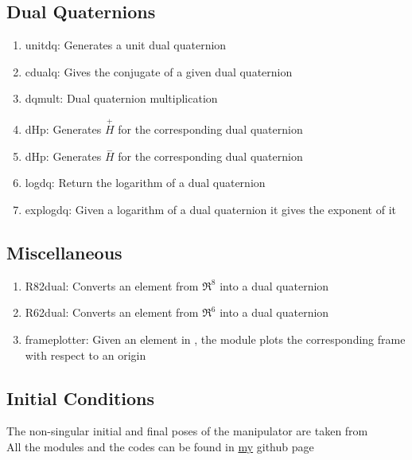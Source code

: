 \documentclass[a4paper,12pt]{article}
\newcommand{\Hp}{\ensuremath{\stackrel{+}{H}}\xspace}
\newcommand{\Hn}{\ensuremath{\stackrel{-}{H}}\xspace}
\begin{document}
\subsection{Dual Quaternions}
\begin{enumerate}
	\item unitdq: Generates a unit dual quaternion
	\item cdualq: Gives the conjugate of a given dual quaternion
	\item dqmult: Dual quaternion multiplication
	\item dHp: Generates \Hp for the corresponding dual quaternion
	\item dHp: Generates \Hn for the corresponding dual quaternion
	\item logdq: Return the logarithm of a dual quaternion
	\item explogdq: Given a logarithm of a dual quaternion it gives the exponent of it
\end{enumerate}
\subsection{Miscellaneous}
\begin{enumerate}
	\item R82dual: Converts an element from $\Re^8$ into a dual quaternion
	\item R62dual: Converts an element from $\Re^6$ into a dual quaternion
	\item frameplotter: Given an element in \se, the module plots the corresponding frame with respect to an origin
\end{enumerate}
\subsection{Initial Conditions}
The non-singular initial and final poses of the manipulator are taken from \cite{ghosal2006robotics}\\

All the modules and the codes can be found in \href{https://github.com/akhilsathuluri/Dual_Quaternion_Control}{my} github page
\end{document}
